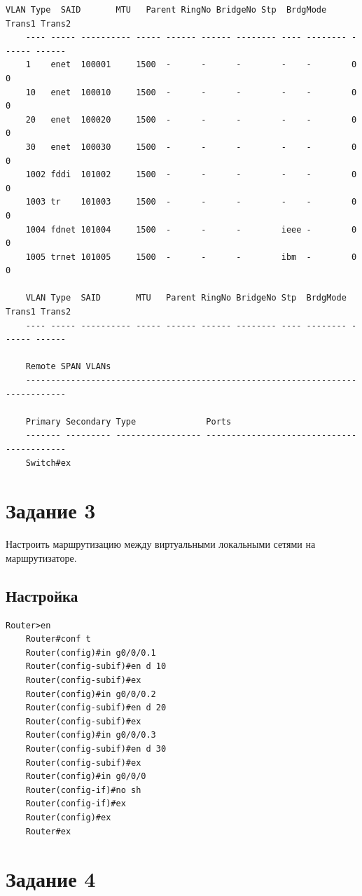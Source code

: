 \documentclass[a4paper,oneside,12pt]{extreport}
\begin{document}
\begin{lstlisting}[gobble=8, caption=Настройка коммутатора Switch0]
	VLAN Type  SAID       MTU   Parent RingNo BridgeNo Stp  BrdgMode Trans1 Trans2
	---- ----- ---------- ----- ------ ------ -------- ---- -------- ------ ------
	1    enet  100001     1500  -      -      -        -    -        0      0
	10   enet  100010     1500  -      -      -        -    -        0      0
	20   enet  100020     1500  -      -      -        -    -        0      0
	30   enet  100030     1500  -      -      -        -    -        0      0
	1002 fddi  101002     1500  -      -      -        -    -        0      0
	1003 tr    101003     1500  -      -      -        -    -        0      0
	1004 fdnet 101004     1500  -      -      -        ieee -        0      0
	1005 trnet 101005     1500  -      -      -        ibm  -        0      0

	VLAN Type  SAID       MTU   Parent RingNo BridgeNo Stp  BrdgMode Trans1 Trans2
	---- ----- ---------- ----- ------ ------ -------- ---- -------- ------ ------

	Remote SPAN VLANs
	------------------------------------------------------------------------------

	Primary Secondary Type              Ports
	------- --------- ----------------- ------------------------------------------
	Switch#ex
\end{lstlisting}

\chapter{Задание 3}

Настроить маршрутизацию между виртуальными локальными сетями на маршрутизаторе.

\section{Настройка}

\begin{lstlisting}[gobble=8, caption=Настройка маршрутизатора Router0]
	Router>en
	Router#conf t
	Router(config)#in g0/0/0.1
	Router(config-subif)#en d 10
	Router(config-subif)#ex
	Router(config)#in g0/0/0.2
	Router(config-subif)#en d 20
	Router(config-subif)#ex
	Router(config)#in g0/0/0.3
	Router(config-subif)#en d 30
	Router(config-subif)#ex
	Router(config)#in g0/0/0
	Router(config-if)#no sh
	Router(config-if)#ex
	Router(config)#ex
	Router#ex
\end{lstlisting}

\chapter{Задание 4}
\end{document}
